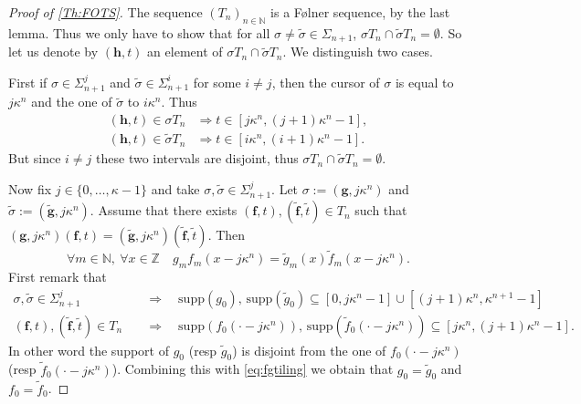\documentclass[english, 11pt, a4paper]{article}
\theoremstyle{definition}
\numberwithin{equation}{section}
\newcommand{\bN}{\mathbb{N}}
\newcommand{\bZ}{\mathbb{Z}}
\newcommand{\mbff}{\boldsymbol{f}}
\newcommand{\mbfg}{\boldsymbol{g}}
\newcommand{\mbfh}{\boldsymbol{h}}
\newcommand{\supp}{\mathrm{supp}}
\begin{document}
\begin{proof}[Proof of {\cref{Th:FOTS}}]
  The sequence $(T_n)_{n\in \bN}$ is a Følner sequence, by the last lemma. Thus we
  only have to show that for all $\sigma \neq \tilde{\sigma} \in \Sigma_{n+1}$,
  $\sigma T_{n}  \cap \tilde{\sigma} T_{n}=\emptyset$. So let us denote by
  $(\mbfh,t)$ an element of $\sigma T_{n}  \cap \tilde{\sigma} T_{n}$. We
  distinguish two cases. 
  
  First if $\sigma \in \Sigma^j_{n+1}$ and $\tilde{\sigma} \in
  \Sigma^i_{n+1}$ for some $i \neq j$, then the cursor of $\sigma$ is equal to
  $j\kappa^n$ and the one of $\tilde{\sigma}$ to $i\kappa^n$. Thus
  \begin{align*}
    \left(\mbfh, t\right) \in \sigma T_{n} & \Rightarrow t \in [j \kappa^n, (j+1)\kappa^n-1],\\
    \left(\mbfh, t\right) \in \tilde{\sigma} T_{n} & \Rightarrow t \in [i\kappa^n,(i+1)\kappa^{n}-1].
  \end{align*}
  But since $i \neq j$ these two intervals are disjoint, thus $\sigma T_{n} \cap
  \tilde{\sigma} T_{n}=\emptyset$.
  \smallskip
   
  Now fix $j\in \{0, \ldots, \kappa-1\}$ and take $\sigma, \tilde{\sigma} \in
  \Sigma^{j}_{n+1}$. Let $\sigma:=\left(\mbfg ,j \kappa^n\right)$ and
  $\tilde{\sigma}:=\left(\tilde{\mbfg} ,j\kappa^n\right)$. Assume 
  that there exists $\left( \mbff,t \right), \left( \tilde{\mbff}, \tilde{t}
  \right) \in T_{n}$ such that $(\mbfg,j\kappa^n) \left( \mbff,t \right)= (\tilde{\mbfg},j\kappa^n)
  \left( \tilde{\mbff}, \tilde{t}\right)$. Then 
  \begin{equation} \label{eq:fgtiling}
    \forall m \in \bN,\ \forall x \in \bZ
    \quad g_mf_m(x- j\kappa^n)=\tilde{g}_m(x)\tilde{f}_m(x - j\kappa^n). 
  \end{equation}
  First remark that
  \begin{align*}
    \sigma, \tilde{\sigma} \in \Sigma^j_{n+1}
    \quad  &\Longrightarrow  \quad \supp(g_0), \, \supp(\tilde{g}_0)
             \subseteq [0,j\kappa^n-1] \cup [(j+1)\kappa^n, \kappa^{n+1}-1]\\
    \left( \mbff,t \right), \left( \tilde{\mbff}, \tilde{t}\right) \in T_{n}
    \quad &\Longrightarrow \quad  \supp({f_0(\cdot - j\kappa^n)}),\,
            \supp(\tilde{f}_0(\cdot - j\kappa^n)) \subseteq [j\kappa^n, (j+1)\kappa^n-1].
  \end{align*}
  In other word the support of $g_0$ (resp $\tilde{g}_0$) is disjoint from
  the one of $f_0(\cdot - j\kappa^n)$ (resp ${\tilde{f}}_0(\cdot - j\kappa^n)$). 
  Combining this with \cref{eq:fgtiling} we obtain that $g_0=\tilde{g}_0$ and
  $f_0=\tilde{f}_0$. 


\end{proof}
\end{document}
